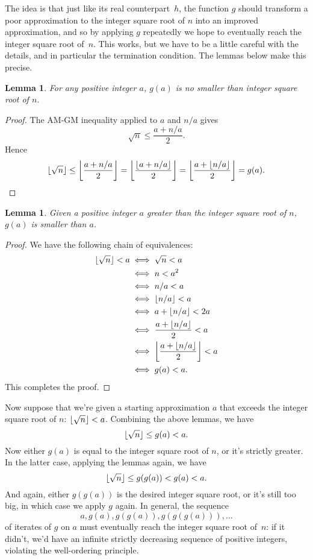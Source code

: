 \documentclass[a4paper]{article}
\DeclarePairedDelimiter\floor{\lfloor}{\rfloor}
\theoremstyle{plain}
\newtheorem{lemma}[theorem]{Lemma}
\theoremstyle{definition}
\begin{document}
The idea is that just like its real counterpart~$h$, the function $g$ should
transform a poor approximation to the integer square root of $n$ into an
improved approximation, and so by applying $g$ repeatedly we hope to eventually
reach the integer square root of~$n$. This works, but we have to be a little
careful with the details, and in particular the termination condition. The
lemmas below make this precise.

\begin{lemma}
  \label{heron_high}
  For any positive integer $a$, $g(a)$ is no smaller than
  integer square root of $n$.
\end{lemma}

\begin{proof}
  The AM-GM inequality applied to $a$ and $n/a$ gives
  $$\sqrt n \le \frac{a + n/a}2.$$
  Hence
  $$\floor{\sqrt n} \le \floor*{\frac{a + n/a}2}
  = \floor*{\frac{\floor{a + n/a}}2}
  = \floor*{\frac{a + \floor{n/a}}2} = g(a).$$
\end{proof}

\begin{lemma}
  \label{heron_decreases}
  Given a positive integer $a$ greater than the integer square
  root of $n$, $g(a)$ is smaller than $a$.
\end{lemma}

\begin{proof}
  We have the following chain of equivalences:
  \begin{align*}
    \floor{\sqrt n} < a &\iff \sqrt n < a \\
                        &\iff n < a^2 \\
                        &\iff n/a < a \\
                        &\iff \floor{n/a} < a \\
                        &\iff a + \floor{n/a} < 2a \\
                        &\iff \frac{a + \floor{n/a}}2 < a \\
                        &\iff \floor*{\frac{a + \floor{n/a}}2} < a \\
                        &\iff g(a) < a.
  \end{align*}
  This completes the proof.
\end{proof}

Now suppose that we're given a starting approximation $a$ that exceeds the
integer square root of $n$: $\floor{\sqrt n} < a$. Combining the above lemmas,
we have
$$\floor{\sqrt n} \le g(a) < a.$$ Now either $g(a)$ is equal to the integer
square root of $n$, or it's strictly greater. In the latter case, applying the
lemmas again, we have
$$\floor{\sqrt n} \le g(g(a)) < g(a) < a.$$ And again, either $g(g(a))$ is the
desired integer square root, or it's still too big, in which case we apply $g$
again. In general, the sequence
$$a, g(a), g(g(a)), g(g(g(a))), \dots$$ of iterates of $g$ on $a$ must
eventually reach the integer square root of~$n$: if it didn't, we'd have an
infinite strictly decreasing sequence of positive integers, violating the
well-ordering principle.
\end{document}
